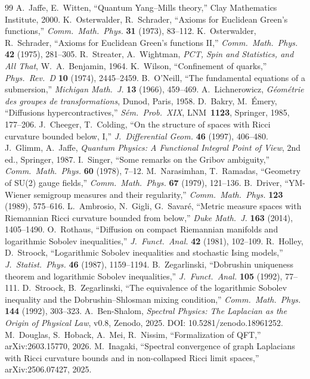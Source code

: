 \documentclass[11pt]{article}
\theoremstyle{definition}
\begin{document}
\begin{thebibliography}{99}
 A.~Jaffe, E.~Witten, ``Quantum Yang--Mills theory,'' Clay Mathematics Institute, 2000.
 K.~Osterwalder, R.~Schrader, ``Axioms for Euclidean Green's functions,'' \textit{Comm.\ Math.\ Phys.} \textbf{31} (1973), 83--112.
 K.~Osterwalder, R.~Schrader, ``Axioms for Euclidean Green's functions II,'' \textit{Comm.\ Math.\ Phys.} \textbf{42} (1975), 281--305.
 R.~Streater, A.~Wightman, \textit{PCT, Spin and Statistics, and All That}, W.~A.~Benjamin, 1964.
 K.~Wilson, ``Confinement of quarks,'' \textit{Phys.\ Rev.\ D} \textbf{10} (1974), 2445--2459.
 B.~O'Neill, ``The fundamental equations of a submersion,'' \textit{Michigan Math.\ J.} \textbf{13} (1966), 459--469.
 A.~Lichnerowicz, \textit{G\'eom\'etrie des groupes de transformations}, Dunod, Paris, 1958.
 D.~Bakry, M.~\'Emery, ``Diffusions hypercontractives,'' \textit{S\'em.\ Prob.\ XIX}, LNM~\textbf{1123}, Springer, 1985, 177--206.
 J.~Cheeger, T.~Colding, ``On the structure of spaces with Ricci curvature bounded below, I,'' \textit{J.\ Differential Geom.} \textbf{46} (1997), 406--480.
 J.~Glimm, A.~Jaffe, \textit{Quantum Physics: A Functional Integral Point of View}, 2nd ed., Springer, 1987.
 I.~Singer, ``Some remarks on the Gribov ambiguity,'' \textit{Comm.\ Math.\ Phys.} \textbf{60} (1978), 7--12.
 M.~Narasimhan, T.~Ramadas, ``Geometry of SU(2) gauge fields,'' \textit{Comm.\ Math.\ Phys.} \textbf{67} (1979), 121--136.
 B.~Driver, ``YM-Wiener semigroup measures and their regularity,'' \textit{Comm.\ Math.\ Phys.} \textbf{123} (1989), 575--616.
 L.~Ambrosio, N.~Gigli, G.~Savar\'e, ``Metric measure spaces with Riemannian Ricci curvature bounded from below,'' \textit{Duke Math.\ J.} \textbf{163} (2014), 1405--1490.
 O.~Rothaus, ``Diffusion on compact Riemannian manifolds and logarithmic Sobolev inequalities,'' \textit{J.\ Funct.\ Anal.} \textbf{42} (1981), 102--109.
 R.~Holley, D.~Stroock, ``Logarithmic Sobolev inequalities and stochastic Ising models,'' \textit{J.\ Statist.\ Phys.} \textbf{46} (1987), 1159--1194.
 B.~Zegarlinski, ``Dobrushin uniqueness theorem and logarithmic Sobolev inequalities,'' \textit{J.\ Funct.\ Anal.} \textbf{105} (1992), 77--111.
 D.~Stroock, B.~Zegarlinski, ``The equivalence of the logarithmic Sobolev inequality and the Dobrushin--Shlosman mixing condition,'' \textit{Comm.\ Math.\ Phys.} \textbf{144} (1992), 303--323.
 A.~Ben-Shalom, \textit{Spectral Physics: The Laplacian as the Origin of Physical Law}, v0.8, Zenodo, 2025. DOI: 10.5281/zenodo.18961252.
 M.~Douglas, S.~Hoback, A.~Mei, R.~Nissim, ``Formalization of QFT,'' arXiv:2603.15770, 2026.
 M.~Inagaki, ``Spectral convergence of graph Laplacians with Ricci curvature bounds and in non-collapsed Ricci limit spaces,'' arXiv:2506.07427, 2025.
\end{thebibliography}
\end{document}

